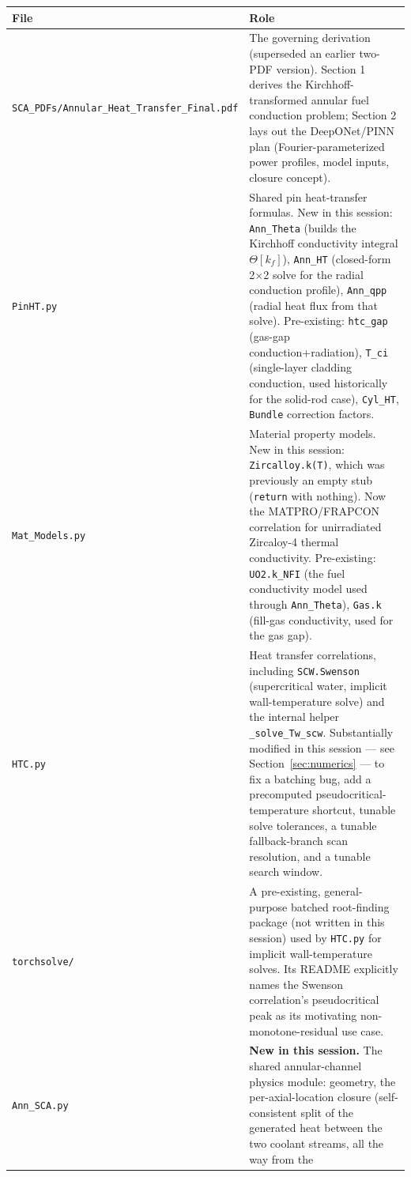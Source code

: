 \documentclass[11pt]{article}
\begin{document}
\begin{longtable}{@{}p{}p{}@{}}
\toprule
\textbf{File} & \textbf{Role} \\
\midrule
\endhead
\texttt{SCA\_PDFs/Annular\_Heat\_Transfer\_Final.pdf} &
The governing derivation (superseded an earlier two-PDF version). Section 1
derives the Kirchhoff-transformed annular fuel conduction problem; Section 2
lays out the DeepONet/PINN plan (Fourier-parameterized power profiles,
model inputs, closure concept). \\
\texttt{PinHT.py} &
Shared pin heat-transfer formulas. New in this session:
\texttt{Ann\_Theta} (builds the Kirchhoff conductivity integral
$\Theta[k_f]$), \texttt{Ann\_HT} (closed-form 2$\times$2 solve for the
radial conduction profile), \texttt{Ann\_qpp} (radial heat flux from that
solve). Pre-existing: \texttt{htc\_gap} (gas-gap conduction+radiation),
\texttt{T\_ci} (single-layer cladding conduction, used historically for the
solid-rod case), \texttt{Cyl\_HT}, \texttt{Bundle} correction factors. \\
\texttt{Mat\_Models.py} &
Material property models. New in this session: \texttt{Zircalloy.k(T)},
which was previously an empty stub (\texttt{return} with nothing). Now the
MATPRO/FRAPCON correlation for unirradiated Zircaloy-4 thermal
conductivity. Pre-existing: \texttt{UO2.k\_NFI} (the fuel conductivity
model used through \texttt{Ann\_Theta}), \texttt{Gas.k} (fill-gas
conductivity, used for the gas gap). \\
\texttt{HTC.py} &
Heat transfer correlations, including \texttt{SCW.Swenson} (supercritical
water, implicit wall-temperature solve) and the internal helper
\texttt{\_solve\_Tw\_scw}. Substantially modified in this session --- see
Section~\ref{sec:numerics} --- to fix a batching bug, add a precomputed
pseudocritical-temperature shortcut, tunable solve tolerances, a tunable
fallback-branch scan resolution, and a tunable search window. \\
\texttt{torchsolve/} &
A pre-existing, general-purpose batched root-finding package (not written
in this session) used by \texttt{HTC.py} for implicit wall-temperature
solves. Its README explicitly names the Swenson correlation's
pseudocritical peak as its motivating non-monotone-residual use case. \\
\texttt{Ann\_SCA.py} &
\textbf{New in this session.} The shared annular-channel physics module:
geometry, the per-axial-location closure (self-consistent split of the
generated heat between the two coolant streams, all the way from the

\end{longtable}
\end{document}
